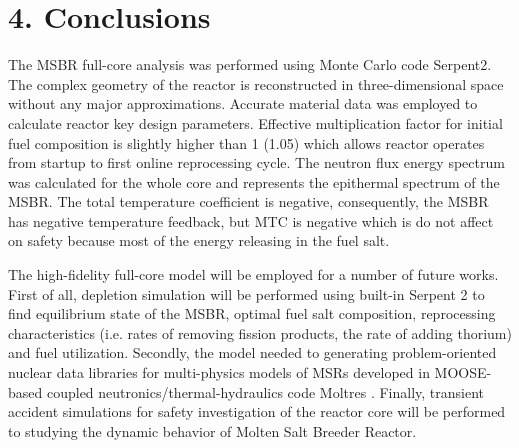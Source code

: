 \documentclass{anstrans}
\begin{document}
\section{4. Conclusions}
The MSBR full-core analysis was performed using Monte Carlo code Serpent2. The complex geometry of the reactor is reconstructed in three-dimensional space without any major approximations. Accurate material data was employed to calculate reactor key design parameters. Effective multiplication factor for initial fuel composition is slightly higher than 1 (1.05) which allows reactor operates from startup to first online reprocessing cycle. The neutron flux energy spectrum was calculated for the whole core and represents the epithermal spectrum of the MSBR. The total temperature coefficient is negative, consequently, the MSBR has negative temperature feedback, but MTC is negative which is do not affect on safety because most of the energy releasing in the fuel salt.

The high-fidelity full-core model will be employed for a number of future works. First of all, depletion simulation will be performed using built-in Serpent 2 to find equilibrium state of the MSBR, optimal fuel salt composition, reprocessing characteristics (i.e. rates of removing fission products, the rate of adding thorium) and fuel utilization. Secondly, the model needed to generating problem-oriented nuclear data libraries for multi-physics models of MSRs developed in MOOSE-based coupled neutronics/thermal-hydraulics code Moltres \cite{lindsay_arfc/moltres:_2017}. Finally, transient accident simulations for safety investigation of the reactor core will be performed to studying the dynamic behavior of Molten Salt Breeder Reactor. 




\end{document}
